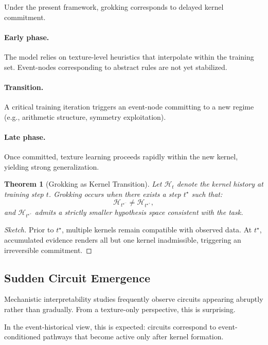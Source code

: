 \documentclass[11pt]{article}
\newtheorem{theorem}{Theorem}
\theoremstyle{remark}
\newcommand{\Hist}{\mathcal{H}}
\begin{document}
Under the present framework, grokking corresponds to delayed kernel
commitment.

\paragraph{Early phase.}
The model relies on texture-level heuristics that interpolate within
the training set. Event-nodes corresponding to abstract rules are not
yet stabilized.

\paragraph{Transition.}
A critical training iteration triggers an event-node committing to a
new regime (e.g., arithmetic structure, symmetry exploitation).

\paragraph{Late phase.}
Once committed, texture learning proceeds rapidly within the new
kernel, yielding strong generalization.

\begin{theorem}[Grokking as Kernel Transition]
Let $\Hist_t$ denote the kernel history at training step $t$. Grokking
occurs when there exists a step $t^\star$ such that:
\[
\Hist_{t^\star^-} \neq \Hist_{t^\star^+},
\]
and $\Hist_{t^\star^+}$ admits a strictly smaller hypothesis space
consistent with the task.
\end{theorem}

\begin{proof}[Sketch]
Prior to $t^\star$, multiple kernels remain compatible with observed
data. At $t^\star$, accumulated evidence renders all but one kernel
inadmissible, triggering an irreversible commitment.
\end{proof}

\subsection{Sudden Circuit Emergence}

Mechanistic interpretability studies frequently observe circuits
appearing abruptly rather than gradually. From a texture-only
perspective, this is surprising.

In the event-historical view, this is expected: circuits correspond to
event-conditioned pathways that become active only after kernel
formation.
\end{document}
